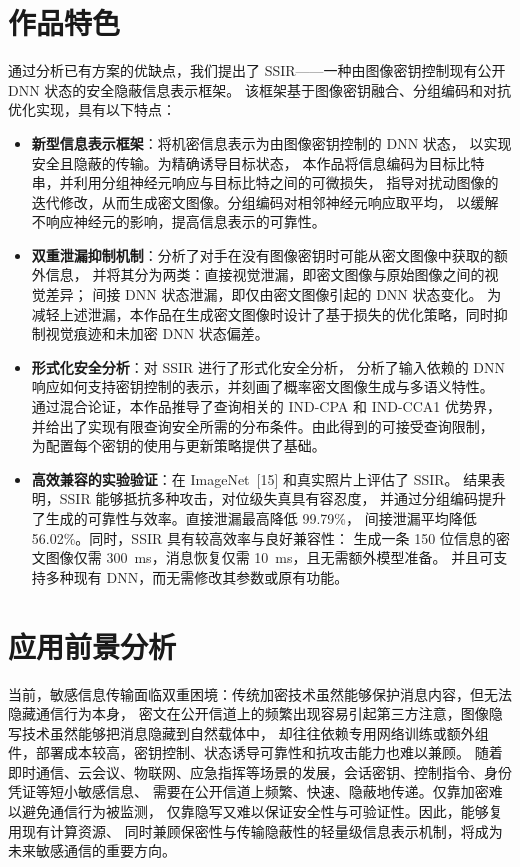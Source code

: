 \documentclass[UTF8,a4paper,zihao=-4,fontset=windows,openany]{ctexbook}
\begin{document}
\section{作品特色}
通过分析已有方案的优缺点，我们提出了 SSIR——一种由图像密钥控制现有公开 DNN 状态的安全隐蔽信息表示框架。
该框架基于图像密钥融合、分组编码和对抗优化实现，具有以下特点：

\begin{itemize}
    \item \textbf{新型信息表示框架}：将机密信息表示为由图像密钥控制的 DNN 状态，
    以实现安全且隐蔽的传输。为精确诱导目标状态，
    本作品将信息编码为目标比特串，并利用分组神经元响应与目标比特之间的可微损失，
    指导对扰动图像的迭代修改，从而生成密文图像。分组编码对相邻神经元响应取平均，
    以缓解不响应神经元的影响，提高信息表示的可靠性。

    \item \textbf{双重泄漏抑制机制}：分析了对手在没有图像密钥时可能从密文图像中获取的额外信息，
    并将其分为两类：直接视觉泄漏，即密文图像与原始图像之间的视觉差异；
    间接 DNN 状态泄漏，即仅由密文图像引起的 DNN 状态变化。
    为减轻上述泄漏，本作品在生成密文图像时设计了基于损失的优化策略，同时抑制视觉痕迹和未加密 DNN 状态偏差。

    \item \textbf{形式化安全分析}：对 SSIR 进行了形式化安全分析，
    分析了输入依赖的 DNN 响应如何支持密钥控制的表示，并刻画了概率密文图像生成与多语义特性。
    通过混合论证，本作品推导了查询相关的 IND-CPA 和 IND-CCA1 优势界，
    并给出了实现有限查询安全所需的分布条件。由此得到的可接受查询限制，
    为配置每个密钥的使用与更新策略提供了基础。

    \item \textbf{高效兼容的实验验证}：在 ImageNet~[15] 和真实照片上评估了 SSIR。
    结果表明，SSIR 能够抵抗多种攻击，对位级失真具有容忍度，
    并通过分组编码提升了生成的可靠性与效率。直接泄漏最高降低 99.79\%，
    间接泄漏平均降低 56.02\%。同时，SSIR 具有较高效率与良好兼容性：
    生成一条 150 位信息的密文图像仅需 300~ms，消息恢复仅需 10~ms，且无需额外模型准备。
    并且可支持多种现有 DNN，而无需修改其参数或原有功能。
\end{itemize}
\section{应用前景分析}
当前，敏感信息传输面临双重困境：传统加密技术虽然能够保护消息内容，但无法隐藏通信行为本身，
密文在公开信道上的频繁出现容易引起第三方注意，图像隐写技术虽然能够把消息隐藏到自然载体中，
却往往依赖专用网络训练或额外组件，部署成本较高，密钥控制、状态诱导可靠性和抗攻击能力也难以兼顾。
随着即时通信、云会议、物联网、应急指挥等场景的发展，会话密钥、控制指令、身份凭证等短小敏感信息、
需要在公开信道上频繁、快速、隐蔽地传递。仅靠加密难以避免通信行为被监测，
仅靠隐写又难以保证安全性与可验证性。因此，能够复用现有计算资源、
同时兼顾保密性与传输隐蔽性的轻量级信息表示机制，将成为未来敏感通信的重要方向。
\end{document}
